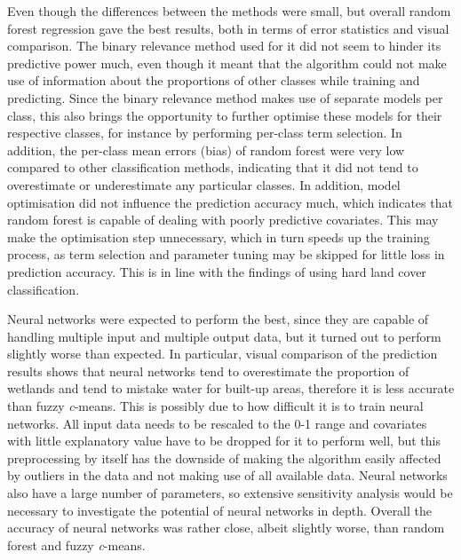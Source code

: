 \documentclass[a4paper,10pt]{book}
\begin{document}
Even though the differences between the methods were small, but overall random forest regression gave the best results, both in terms of error statistics and visual comparison. The binary relevance method used for it did not seem to hinder its predictive power much, even though it meant that the algorithm could not make use of information about the proportions of other classes while training and predicting. Since the binary relevance method makes use of separate models per class, this also brings the opportunity to further optimise these models for their respective classes, for instance by performing per-class term selection. In addition, the per-class mean errors (bias) of random forest were very low compared to other classification methods, indicating that it did not tend to overestimate or underestimate any particular classes. In addition, model optimisation did not influence the prediction accuracy much, which indicates that random forest is capable of dealing with poorly predictive covariates. This may make the optimisation step unnecessary, which in turn speeds up the training process, as term selection and parameter tuning may be skipped for little loss in prediction accuracy. This is in line with the findings of \citet{Pelletier2016hardrf} using hard land cover classification.

Neural networks were expected to perform the best, since they are capable of handling multiple input and multiple output data, but it turned out to perform slightly worse than expected. In particular, visual comparison of the prediction results shows that neural networks tend to overestimate the proportion of wetlands and tend to mistake water for built-up areas, therefore it is less accurate than fuzzy \textit{c}-means. This is possibly due to how difficult it is to train neural networks. All input data needs to be rescaled to the 0-1 range and covariates with little explanatory value have to be dropped for it to perform well, but this preprocessing by itself has the downside of making the algorithm easily affected by outliers in the data and not making use of all available data. Neural networks also have a large number of parameters, so extensive sensitivity analysis would be necessary to investigate the potential of neural networks in depth. Overall the accuracy of neural networks was rather close, albeit slightly worse, than random forest and fuzzy \textit{c}-means.
\end{document}
